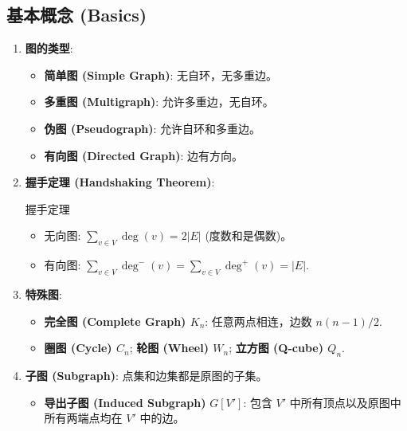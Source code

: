 \documentclass[a4paper,12pt]{ctexart}
\begin{document}
\subsection{基本概念 (Basics)}
\begin{enumerate}
    \item \textbf{图的类型}:
    \begin{itemize}
        \item \textbf{简单图 (Simple Graph)}: 无自环，无多重边。
        \item \textbf{多重图 (Multigraph)}: 允许多重边，无自环。
        \item \textbf{伪图 (Pseudograph)}: 允许自环和多重边。
        \item \textbf{有向图 (Directed Graph)}: 边有方向。
    \end{itemize}

    \item \textbf{握手定理 (Handshaking Theorem)}:
    \begin{mythm}{握手定理}{}
    \begin{itemize}
        \item 无向图: $\sum_{v \in V} \deg(v) = 2|E|$ (度数和是偶数)。
        \item 有向图: $\sum_{v \in V} \deg^-(v) = \sum_{v \in V} \deg^+(v) = |E|$.
    \end{itemize}
    \end{mythm}

    \item \textbf{特殊图}:
    \begin{itemize}
        \item \textbf{完全图 (Complete Graph) $K_n$}: 任意两点相连，边数 $n(n-1)/2$.
        \item \textbf{圈图 (Cycle) $C_n$}; \textbf{轮图 (Wheel) $W_n$}; \textbf{立方图 (Q-cube) $Q_n$}.
    \end{itemize}

    \item \textbf{子图 (Subgraph)}: 点集和边集都是原图的子集。
    \begin{itemize}
        \item \textbf{导出子图 (Induced Subgraph)} $G[V']$: 包含 $V'$ 中所有顶点以及原图中所有两端点均在 $V'$ 中的边。
    \end{itemize}
\end{enumerate}
\end{document}
